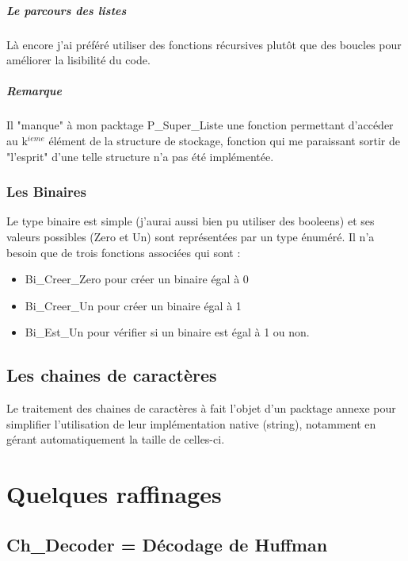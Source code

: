 \documentclass{book}
\begin{document}
\paragraph{Le parcours des listes}
Là encore j'ai préféré utiliser des fonctions récursives plut\^{o}t que des boucles pour améliorer la lisibilité du code.
\paragraph{Remarque}
Il "manque" à mon packtage P\_Super\_Liste une fonction permettant d'accéder au k$^{ieme}$ élément de la structure de stockage, fonction qui me paraissant sortir de "l'esprit" d'une telle structure n'a pas été implémentée.

\subsection{Les Binaires}
Le type binaire est simple (j'aurai aussi bien pu utiliser des booleens) et ses valeurs possibles (Zero et Un) sont représentées par un type énuméré. Il n'a besoin que de trois fonctions associées qui sont :
\begin{itemize}
	\item Bi\_Creer\_Zero pour créer un binaire égal à 0
	\item Bi\_Creer\_Un pour créer un binaire égal à 1
	\item Bi\_Est\_Un pour vérifier si un binaire est égal à 1 ou non.
\end{itemize}

\section{Les chaines de caractères}
Le traitement des chaines de caractères à fait l'objet d'un packtage annexe pour simplifier l'utilisation de leur implémentation native (string), notamment en gérant automatiquement la taille de celles-ci.





\chapter{Quelques raffinages}

\section{Ch\_Decoder = Décodage de Huffman}
\end{document}
